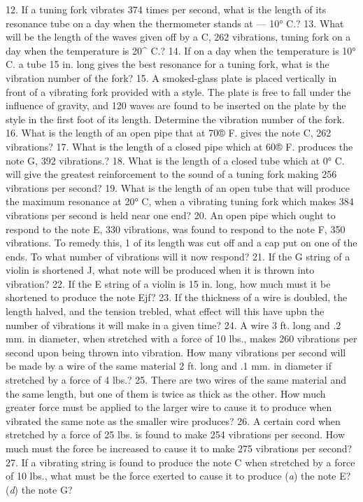 12. If a tuning fork vibrates 374 times per second, what is the length of its resonance tube on a day when the thermometer stands at — 10° C.?
13. What will be the length of the waves given off by a C, 262 vibrations, tuning fork on a day when the temperature is 20^ C.?
14. If on a day when the temperature is 10° C. a tube 15 in. long gives the best resonance for a tuning fork, what is the vibration number of the fork?
15. A smoked-glass plate is placed vertically in front of a vibrating fork provided with a style. The plate is free to fall under the influence of gravity, and 120 waves are found to be inserted on the plate by the style in the first foot of its length. Determine the vibration number of the fork.
16. What is the length of an open pipe that at 70® F. gives the note C, 262 vibrations?
17. What is the length of a closed pipe which at 60® F. produces the note G, 392 vibrations.?
18. What is the length of a closed tube which at 0° C. will give the greatest reinforcement to the sound of a tuning fork making 256 vibrations per second?
19. What is the length of an open tube that will produce the maximum resonance at 20° C, when a vibrating tuning fork which makes 384 vibrations per second is held near one end?
20. An open pipe which ought to respond to the note E, 330 vibrations, was found to respond to the note F, 350 vibrations. To remedy this, 1 of its length was cut off and a cap put on one of the ends. To what number of vibrations will it now respond?
21. If the G string of a violin is shortened J, what note will be produced when it is thrown into vibration?
22. If the E string of a violin is 15 in. long, how much must it be shortened to produce the note Ejf?
23. If the thickness of a wire is doubled, the length halved, and the tension trebled, what effect will this have upbn the number of vibrations it will make in a given time?
24. A wire 3 ft. long and .2 mm. in diameter, when stretched with a force of 10 lbs., makes 260 vibrations per second upon being thrown into vibration. How many vibrations per second will be made by a wire of the same material 2 ft. long and .1 mm. in diameter if stretched by a force of 4 lbs.?
25. There are two wires of the same material and the same length, but one of them is twice as thick as the other. How much greater force must be applied to the larger wire to cause it to produce when vibrated the same note as the smaller wire produces?
26. A certain cord when stretched by a force of 25 lbs. is found to make 254 vibrations per second. How much must the force be increased to cause it to make 275 vibrations per second?
27. If a vibrating string is found to produce the note C when stretched by a force of 10 lbs., what must be the force exerted to cause it to produce (\emph{a}) the note E? (\emph{d}) the note G?
